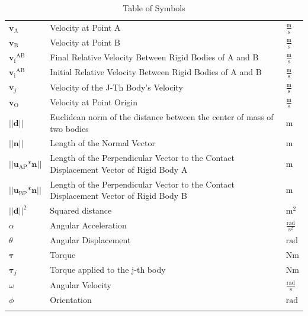 \documentclass[12pt]{article}
\begin{document}
\begin{longtabu}{l X[l] l}
\\
${\mathbf{v}_{\text{A}}}$ & Velocity at Point A & $\frac{\text{m}}{\text{s}}$
\\
${\mathbf{v}_{\text{B}}}$ & Velocity at Point B & $\frac{\text{m}}{\text{s}}$
\\
${{\mathbf{v}_{\text{f}}}^{\text{A}\text{B}}}$ & Final Relative Velocity Between Rigid Bodies of A and B & $\frac{\text{m}}{\text{s}}$
\\
${{\mathbf{v}_{\text{i}}}^{\text{A}\text{B}}}$ & Initial Relative Velocity Between Rigid Bodies of A and B & $\frac{\text{m}}{\text{s}}$
\\
${\mathbf{v}_{j}}$ & Velocity of the J-Th Body's Velocity & $\frac{\text{m}}{\text{s}}$
\\
${\mathbf{v}_{\text{O}}}$ & Velocity at Point Origin & $\frac{\text{m}}{\text{s}}$
\\
$\text{||}\mathbf{d}\text{||}$ & Euclidean norm of the distance between the center of mass of two bodies & ${\text{m}}$
\\
$\text{||}\mathbf{n}\text{||}$ & Length of the Normal Vector & ${\text{m}}$
\\
$\text{||}{\mathbf{u}_{\text{A}\text{P}}}\text{*}\mathbf{n}\text{||}$ & Length of the Perpendicular Vector to the Contact Displacement Vector of Rigid Body A & ${\text{m}}$
\\
$\text{||}{\mathbf{u}_{\text{B}\text{P}}}\text{*}\mathbf{n}\text{||}$ & Length of the Perpendicular Vector to the Contact Displacement Vector of Rigid Body B & ${\text{m}}$
\\
${\text{||}\mathbf{d}\text{||}^{2}}$ & Squared distance & ${\text{m}^{2}}$
\\
$α$ & Angular Acceleration & $\frac{\text{rad}}{\text{s}^{2}}$
\\
$θ$ & Angular Displacement & ${\text{rad}}$
\\
$\mathbf{τ}$ & Torque & $\text{N}\text{m}$
\\
${\mathbf{τ}_{j}}$ & Torque applied to the j-th body & $\text{N}\text{m}$
\\
$ω$ & Angular Velocity & $\frac{\text{rad}}{\text{s}}$
\\
$ϕ$ & Orientation & ${\text{rad}}$
\\
\bottomrule
\caption{Table of Symbols}
\label{Table:ToS}
\end{longtabu}
\end{document}
